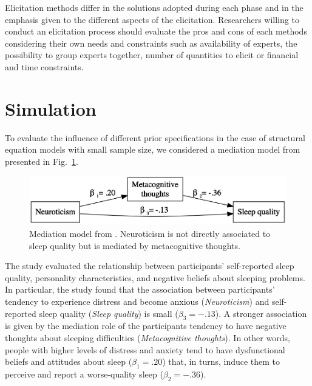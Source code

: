 \documentclass[graybox]{svmult}
\begin{document}
Elicitation methods differ in the solutions adopted during each phase and in the emphasis given to the different aspects of the elicitation. 
Researchers willing to conduct an elicitation process should evaluate the pros and cons of each methods considering their own needs and constraints such as availability of experts, the possibility to group experts together, number of quantities to elicit or financial and time constraints.

\section{Simulation}
\label{sec:simulation}

To evaluate the influence of different prior specifications in the case of structural equation models with small sample size, we considered a mediation model from \cite{sellaPersonalityTraitsSleep2020}  presented in Fig.~\ref{fig:example_model}. 
\begin{figure}[b]
	\sidecaption
	\includegraphics[width = .64\textwidth]{figure/Plot_example_model}
	\caption{Mediation model from \cite{sellaPersonalityTraitsSleep2020}. Neuroticism is not directly associated to sleep quality but is mediated by metacognitive thoughts.}
	\label{fig:example_model}
\end{figure}
The study evaluated the relationship between participants' self-reported sleep quality, personality characteristics, and negative beliefs about sleeping problems. In particular, the study found that the association between participants' tendency to experience distress and become anxious (\emph{Neuroticism}) and self-reported sleep quality (\emph{Sleep quality}) is small ($\beta_3=-.13$).  A stronger association is given  by the mediation role of the participants tendency to have negative thoughts about sleeping difficulties (\emph{Metacognitive thoughts}). In other words, people with higher levels of distress and anxiety tend to have dysfunctional beliefs and attitudes about sleep ($\beta_1=.20$) that, in turns, induce them to perceive and report a worse-quality sleep ($\beta_2=-.36$).
\end{document}
